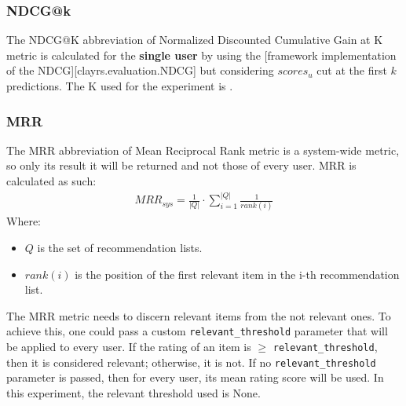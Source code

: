 \documentclass[11pt]{article}
\begin{document}
\subsubsection{NDCG@k}\label{subsubsec:ndcg-k}
The NDCG@K abbreviation of Normalized Discounted Cumulative Gain at K metric is calculated for the \textbf{single user}
by using the [framework implementation of the NDCG][clayrs.evaluation.NDCG] but considering $scores_{u}$ cut at the
first $k$ predictions.
The K used for the experiment is .
\hfill\break
\hfill\break

\subsubsection{MRR}\label{subsubsec:mrr}
The MRR abbreviation of Mean Reciprocal Rank metric is a system-wide metric, so only its result it will be returned
and not those of every user.
MRR is calculated as such:
\hfill\break
\hfill\break
    \[
       \begin{gathered}
           MRR_{sys} = \frac{1}{|Q|}\cdot\sum_{i=1}^{|Q|}\frac{1}{rank(i)}
       \end{gathered}
    \]
\hfill\break
\hfill\break
    Where:
\begin{itemize}
    \item $Q$ is the set of recommendation lists.
    \item $rank(i)$ is the position of the first relevant item in the i-th recommendation list.
\end{itemize}
\hfill\break
\hfill\break
The MRR metric needs to discern relevant items from the not relevant ones.
To achieve this, one could pass a custom \texttt{relevant\_threshold} parameter that will be applied to every user.
If the rating of an item is $\geq$ \texttt{relevant\_threshold}, then it is considered relevant; otherwise, it is not.
If no \texttt{relevant\_threshold} parameter is passed, then for every user, its mean rating score will be used.
In this experiment, the relevant threshold used is
None.
\hfill\break
\hfill\break

\end{document}
